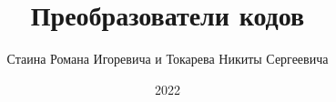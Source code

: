 \documentclass[spec, och, labwork]{shiza}
\begin{document}
\chair{}

\title{Преобразователи кодов}






\author{Стаина Романа Игоревича и Токарева Никиты Сергеевича}








\date{2022}

\maketitle

\end{document}
